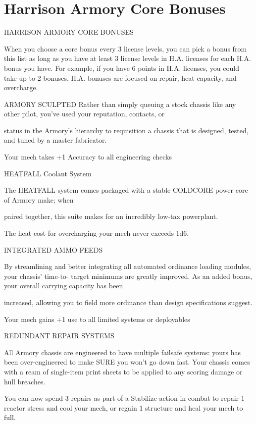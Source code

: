 \section{Harrison Armory Core Bonuses}

                           HARRISON ARMORY CORE BONUSES

When you choose a core bonus every 3 license levels, you can pick a bonus from this list as long
as you have at least 3 license levels in H.A. licenses for each H.A. bonus you have. For example,
if you have 6 points in H.A. licenses, you could take up to 2 bonuses. H.A. bonuses are focused
on repair, heat capacity, and overcharge.


ARMORY SCULPTED
Rather than simply queuing a stock chassis like any other pilot, you’ve used your reputation, contacts, or

status in the Armory’s hierarchy to requisition a chassis that is designed, tested, and tuned by a master
fabricator.

Your mech takes +1 Accuracy to all engineering checks


HEATFALL Coolant System

The HEATFALL system comes packaged with a stable COLDCORE power core of Armory make; when

paired together, this suite makes for an incredibly low-tax powerplant.

The heat cost for overcharging your mech never exceeds 1d6.


INTEGRATED AMMO FEEDS

By streamlining and better integrating all automated ordinance loading modules, your chassis’ time-to-
target minimums are greatly improved. As an added bonus, your overall carrying capacity has been

increased, allowing you to field more ordinance than design specifications suggest.

Your mech gains +1 use to all limited systems or deployables


REDUNDANT REPAIR SYSTEMS

All Armory chassis are engineered to have multiple failsafe systems: yours has been over-engineered to
make SURE you won’t go down fast. Your chassis comes with a ream of single-item print sheets to be
applied to any scoring damage or hull breaches.

You can now spend 3 repairs as part of a Stabilize action in combat to repair 1 reactor stress and
cool your mech, or regain 1 structure and heal your mech to full.


